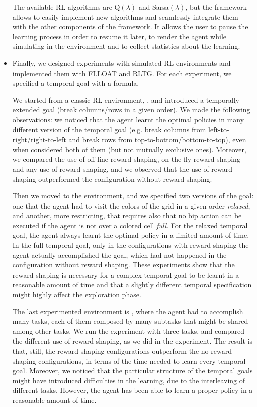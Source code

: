 \begin{itemize}
	The available RL algorithms are Q$(\lambda)$ and Sarsa$(\lambda)$, but the framework allows to easily implement new algorithms and seamlessly integrate them with the other components of the framework. It allows the user to pause the learning process in order to resume it later, to render the agent while simulating in the environment and to collect statistics about the learning.
	
	\item Finally, we designed experiments with simulated RL environments and implemented them with FLLOAT and RLTG. For each experiment, we specified a temporal goal with a \LLf formula.
	
	We started from a classic RL environment, \Breakout, and introduced a temporally extended goal (break columns/rows in a given order). We made the following observations: we noticed that the agent learnt the optimal policies in many different version of the temporal goal (e.g. break columns from left-to-right/right-to-left and break rows from top-to-bottom/bottom-to-top), even when considered both of them (but not mutually exclusive ones). Moreover, we compared the use of off-line reward shaping, on-the-fly reward shaping and any use of reward shaping, and we observed that the use of reward shaping outperformed the configuration without reward shaping.
	
	Then we moved to the \Sapientino environment, and we specified two versions of the goal: one that the agent had to visit the colors of the grid in a given order \emph{relaxed}, and another, more restricting, that requires also that no bip action can be executed if the agent is not over a colored cell \emph{full}. For the relaxed temporal goal, the agent always learnt the optimal policy in a limited amount of time. In the full temporal goal, only in the configurations with reward shaping the agent actually accomplished the goal, which had not happened in the configuration without reward shaping. These experiments show that the reward shaping is necessary for a complex temporal goal to be learnt in a reasonable amount of time and that a slightly different temporal specification might highly affect the exploration phase.
	
	The last experimented environment is \Minecraft, where the agent had to accomplish many tasks, each of them composed by many subtasks that might be shared among other tasks. We run the experiment with three tasks, and compared the different use of reward shaping, as we did in the \Breakout experiment. The result is that, still, the reward shaping configurations outperform the no-reward shaping configurations, in terms of the time needed to learn every temporal goal. 
	Moreover, we noticed that the particular structure of the temporal goals might have introduced difficulties in the learning, due to the interleaving of different tasks. However, the agent has been able to learn a proper policy in a reasonable amount of time.
	
	

\end{itemize}

